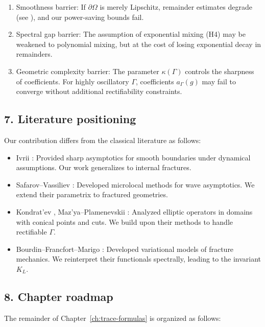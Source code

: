 \begin{enumerate}
  \item Smoothness barrier: If $\partial\Omega$ is merely Lipschitz, remainder estimates
  degrade (see \cite{MazyaPlamenevskii1980}), and our power-saving bounds fail.
  \item Spectral gap barrier: The assumption of exponential mixing (H4) may be weakened
  to polynomial mixing, but at the cost of losing exponential decay in remainders.
  \item Geometric complexity barrier: The parameter $\kappa(\Gamma)$ controls the
  sharpness of coefficients. For highly oscillatory $\Gamma$, coefficients $a_\Gamma(g)$
  may fail to converge without additional rectifiability constraints.
\end{enumerate}

\subsection*{7. Literature positioning}
Our contribution differs from the classical literature as follows:

\begin{itemize}
  \item Ivrii \cite{Ivrii1980, Ivrii1998}: Provided sharp asymptotics for smooth
  boundaries under dynamical assumptions. Our work generalizes to internal fractures.
  \item Safarov--Vassiliev \cite{SafarovVassiliev1996}: Developed microlocal methods
  for wave asymptotics. We extend their parametrix to fractured geometries.
  \item Kondrat'ev \cite{Kondratev1967}, Maz'ya--Plamenevskii \cite{MazyaPlamenevskii1980}:
  Analyzed elliptic operators in domains with conical points and cuts. We build
  upon their methods to handle rectifiable $\Gamma$.
  \item Bourdin--Francfort--Marigo \cite{BourdinFrancfortMarigo2008}: Developed
  variational models of fracture mechanics. We reinterpret their functionals
  spectrally, leading to the invariant $K_L$.
\end{itemize}

\subsection*{8. Chapter roadmap}
The remainder of Chapter~\ref{ch:trace-formulas} is organized as follows:

